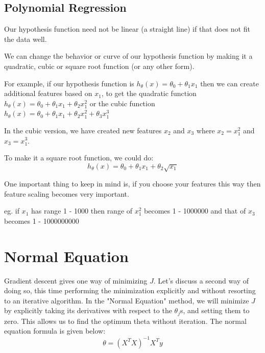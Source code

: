\documentclass[10pt,a4paper,UTF8]{article}
\begin{document}
\subsection{Polynomial Regression}
\label{sec:org4a749a0}
Our hypothesis function need not be linear (a straight line) if that does not fit the data well.

We can change the behavior or curve of our hypothesis function by making it a quadratic, cubic or square root function (or any other form).

For example, if our hypothesis function is \(h_{\theta}(x) = \theta_{0} + \theta_{1}x_{1}\) then we can create additional features based on \(x_{1}\), to get the quadratic function \(h_{\theta}(x) = \theta_{0} + \theta_{1}x_{1} + \theta_{2}x_{1}^{2}\) or the cubic function \(h_{\theta}(x) = \theta_{0} + \theta_{1}x_{1} + \theta_{2}x_{1}^{2} + \theta_{3}x_{1}^{3}\)

In the cubic version, we have created new features \(x_{2}\) and \(x_{3}\) where \(x_{2}  = x_{1}^{2}\) and \(x_{3} = x_{1}^{3}\).

To make it a square root function, we could do:
\begin{equation}
\label{eq:6}
h_{\theta}(x) = \theta_{0} + \theta_{1}x_{1} + \theta_{2}\sqrt{x_{1}}
\end{equation}

One important thing to keep in mind is, if you choose your features this way then feature scaling becomes very important.

eg. if \(x_{1}\) has range 1 - 1000 then range of \(x_{1}^{2}\) becomes 1 - 1000000 and that of \(x_{3}\) becomes 1 - 1000000000
\section{Normal Equation}
\label{sec:orgd1bc2af}


Gradient descent gives one way of minimizing \(J\). Let’s discuss a second way of doing so, this time performing the minimization explicitly and without resorting to an iterative algorithm. In the "Normal Equation" method, we will minimize \(J\) by explicitly taking its derivatives with respect to the \(\theta_{j}\)s, and setting them to zero. This allows us to find the optimum theta without iteration. The normal equation formula is given below:
\begin{equation}
\label{eq:7}
\theta = (X^{T}X)^{-1}X^{T}y
\end{equation}
\end{document}
